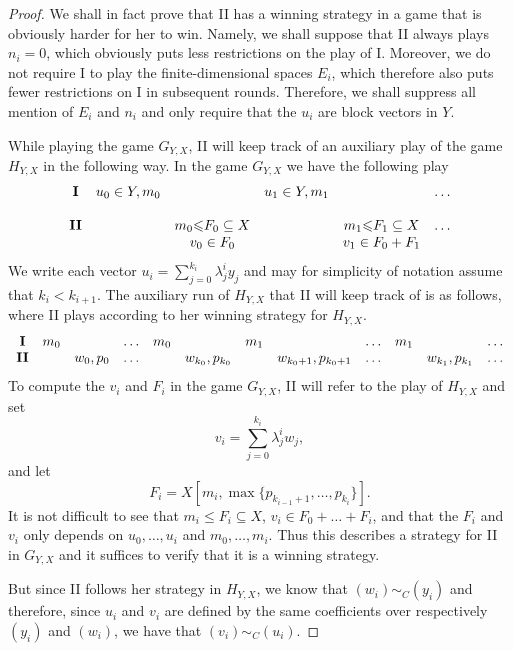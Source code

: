 \documentclass[10pt]{amsart}
\numberwithin{equation}{section}
\begin{document}
\begin{proof}
We shall in fact prove that II has a winning strategy in a game that is
obviously harder for her to win. Namely, we shall suppose that II always plays
$n_i=0$, which obviously puts less restrictions on the play of I. Moreover, we
do not require I to play the finite-dimensional spaces $E_i$, which therefore
also puts fewer restrictions on I in subsequent rounds. Therefore, we shall
suppress all mention of $E_i$ and $n_i$ and only require that the $u_i$ are
block vectors in $Y$.

While playing the game $G_{Y,X}$, II will keep track of an auxiliary play of
the game $H_{Y,X}$ in the following way. In the game $G_{Y,X}$ we have the
following play
\[\begin{array}{ccccccc}
{\bf I}        &u_0\in  Y, m_0&      &  u_1\in Y, m_1&     & \ldots     \\
                   &               &      &            &     &            \\
{\bf II}       &        & m_0{\ensuremath{\leqslant}} F_0 \subseteq X&       &m_1{\ensuremath{\leqslant}} F_1 \subseteq X & \ldots   \\
                   &           &v_0 \in F_0 &       &v_1 \in F_0+F_1&     \\
 \end{array}\]
We write each vector $u_i=\sum_{j=0}^{k_i}\lambda_j^iy_j$ and may for
simplicity of notation assume that $k_i<k_{i+1}$. The auxiliary run of
$H_{Y,X}$ that II will keep track of is as follows, where II plays according to
her winning strategy for $H_{Y,X}$.
$$
\begin{array}{cccccccccccc}
{\bf I} & m_0 && \ldots & m_0 &  &m_1 & &\ldots& m_1& &\ldots \\
{\bf II}  &  & w_0,p_0 & \ldots& & w_{k_0}, p_{k_0} &  & w_{k_0+1},p_{k_0+1} &\ldots && w_{k_1},p_{k_1} &\ldots
\end{array}
$$
To compute the $v_i$ and $F_i$ in the game $G_{Y,X}$, II will refer to the play of $H_{Y,X}$ and set
$$
v_i=\sum_{j=0}^{k_i}\lambda_j^iw_j,
$$
and let
$$
F_i=X[m_i,\max\{p_{k_{i-1}+1},\ldots,p_{k_i}\}].
$$
It is not difficult to see that $m_i{\ensuremath{\leqslant}} F_i\subseteq X$, $v_i\in F_0+\ldots
+F_i$, and that the $F_i$ and $v_i$ only depends on $u_0,\ldots, u_i$ and $m_0,
\ldots, m_i$. Thus this describes a strategy for II in $G_{Y,X}$ and it
suffices to verify that it is a winning strategy.

But since II follows her strategy in $H_{Y,X}$, we know that $(w_i)\sim_C(y_i)$
and therefore, since $u_i$ and $v_i$ are defined by the same coefficients over
respectively $(y_i)$ and $(w_i)$, we have that $(v_i)\sim_C(u_i)$.
\end{proof}
\end{document}
